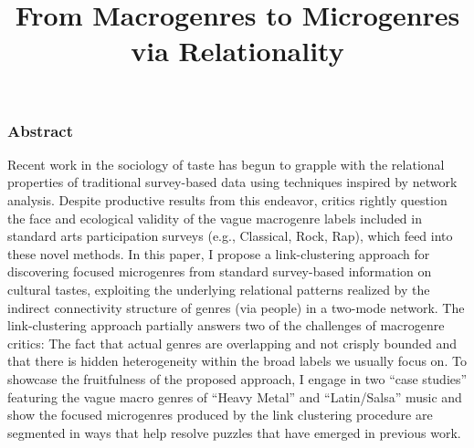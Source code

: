 \documentclass[a4paper,12pt]{article}
\title{From Macrogenres to Microgenres via Relationality}
\begin{document}
\maketitle
\subsubsection*{Abstract} 
Recent work in the sociology of taste has begun to grapple with the relational properties of traditional survey-based data using techniques inspired by network analysis. Despite productive results from this endeavor, critics rightly question the face and ecological validity of the vague macrogenre labels included in standard arts participation surveys (e.g., Classical, Rock, Rap), which feed into these novel methods. In this paper, I propose a link-clustering approach for discovering focused microgenres from standard survey-based information on cultural tastes, exploiting the underlying relational patterns realized by the indirect connectivity structure of genres (via people) in a two-mode network. The link-clustering approach partially answers two of the challenges of macrogenre critics: The fact that actual genres are overlapping and not crisply bounded and that there is hidden heterogeneity within the broad labels we usually focus on. To showcase the fruitfulness of the proposed approach, I engage in two ``case studies'' featuring the vague macro genres of ``Heavy Metal'' and ``Latin/Salsa'' music and show the focused microgenres produced by the link clustering procedure are segmented in ways that help resolve puzzles that have emerged in previous work. 
\newpage
\end{document}
